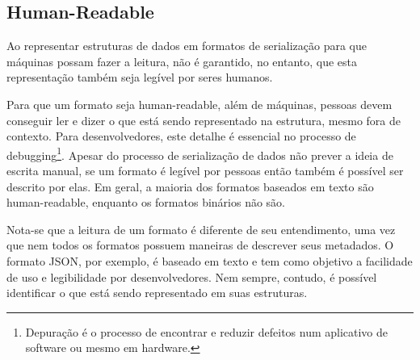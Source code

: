 \subsection[Human-Readable]{Human-Readable}

Ao representar estruturas de dados em formatos de serialização para que máquinas possam fazer a leitura, não é garantido, no entanto, que esta representação também seja legível por seres humanos.

Para que um formato seja human-readable, além de máquinas, pessoas devem conseguir ler e dizer o que está sendo representado na estrutura, mesmo fora de contexto. Para desenvolvedores, este detalhe é essencial no processo de debugging\footnote{
  Depuração é o processo de encontrar e reduzir defeitos num aplicativo de software ou mesmo em hardware.
}. Apesar do processo de serialização de dados não prever a ideia de escrita manual, se um formato é legível por pessoas então também é possível ser descrito por elas. Em geral, a maioria dos formatos baseados em texto são human-readable, enquanto os formatos binários não são. \cite{SumarayMakki2012}

Nota-se que a leitura de um formato é diferente de seu entendimento, uma vez que nem todos os formatos possuem maneiras de descrever seus metadados. O formato JSON, por exemplo, é baseado em texto e tem como objetivo a facilidade de uso e legibilidade por desenvolvedores. Nem sempre, contudo, é possível identificar o que está sendo representado em suas estruturas.
